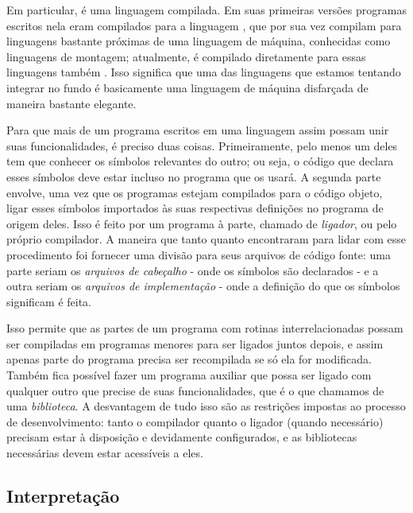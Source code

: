     Em particular, \CXX{} é uma linguagem compilada. Em suas
    primeiras versões programas escritos nela eram compilados para a linguagem
    \C{}, que por sua vez compilam para linguagens bastante próximas de uma
    linguagem de máquina, conhecidas como linguagens de montagem; atualmente,
    \CXX{} é compilado diretamente para essas linguagens também \cite{cpp:01}.
    Isso significa que uma das linguagens que estamos tentando integrar no fundo
    é basicamente uma linguagem de máquina disfarçada de maneira bastante
    elegante.
    
    Para que mais de um programa escritos em uma linguagem assim
    possam unir suas funcionalidades, é preciso duas coisas. Primeiramente, pelo
    menos um deles tem que conhecer os símbolos\footnotemark{} relevantes do
    outro; ou seja, o código que declara esses símbolos deve estar incluso no
    programa que os usará. A segunda parte envolve, uma vez que os programas
    estejam compilados para o código objeto, ligar esses símbolos importados às
    suas respectivas definições no programa de origem deles. Isso é feito por um
    programa à parte, chamado de \emph{ligador}, ou pelo próprio compilador. A
    maneira que tanto \C{} quanto \CXX{} encontraram para lidar com esse
    procedimento foi fornecer uma divisão para seus arquivos de código fonte:
    uma parte seriam os \emph{arquivos de cabeçalho} - onde os símbolos são
    declarados - e a outra seriam os \emph{arquivos de implementação} - onde a
    definição do que os símbolos significam é feita.


    Isso permite que as partes de um programa com rotinas interrelacionadas
    possam ser compiladas em programas menores para ser ligados juntos depois,
    e assim apenas parte do programa precisa ser recompilada se só ela for
    modificada. Também fica possível fazer um programa auxiliar que possa ser
    ligado com qualquer outro que precise de suas funcionalidades, que é o que
    chamamos de uma \emph{biblioteca}. A desvantagem de tudo isso são as
    restrições impostas ao processo de desenvolvimento: tanto o compilador
    quanto o ligador (quando necessário) precisam estar à disposição e
    devidamente configurados, e as bibliotecas necessárias devem estar
    acessíveis a eles.

    \subsection{Interpretação}
    \label{cap:conceitos:maquina:interpretacao}

